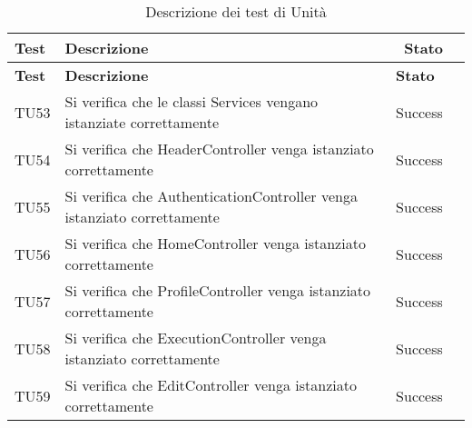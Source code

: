 	 \begin{longtable} [c]{| p{1cm} | p{6cm} |p{3cm} | p{2cm} |}
		 			\caption{Descrizione dei test di Unità \label{tab:verTestUnit}}\\
	 		 \hline
	 		 \textbf{Test} & \textbf{Descrizione} & \ \textbf{Stato} \\
	 		 \hline
	 		 \endfirsthead
	 		 \hline
	 		 \textbf{Test} & \textbf{Descrizione} & \textbf{Stato} \\
	 		 \hline
		 			\endhead
	 		 \hline
	 		 \endfoot
	 		 \hline
	 		 \endlastfoot
          TU53 & Si verifica che le classi Services vengano istanziate correttamente & Success \\
          \hline
          TU54 & Si verifica che HeaderController venga istanziato correttamente & Success \\
          \hline 
          TU55 & Si verifica che AuthenticationController venga istanziato correttamente & Success\\
          \hline
          TU56 & Si verifica che HomeController venga istanziato correttamente & Success \\
          \hline
          TU57 & Si verifica che ProfileController venga istanziato correttamente & Success \\
          \hline
          TU58 & Si verifica che ExecutionController venga istanziato correttamente & Success \\
          \hline
          TU59 & Si verifica che EditController venga istanziato correttamente & Success \\
		 		\end{longtable}
		 		
